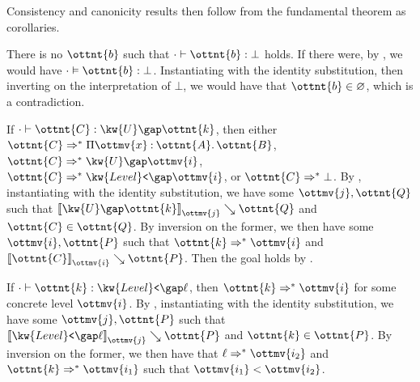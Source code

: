 \documentclass[a4paper,UKenglish,cleveref,autoref,thm-restate]{lipics-v2021}
\begin{document}
Consistency and canonicity results then follow from the fundamental theorem as corollaries.

\begin{corollary}[Consistency]
  There is no $\ottnt{b}$ such that $  \cdot   \vdash  \ottnt{b}  \mathrel{:}   \bot  $ holds.
  If there were, by ,
  we would have $  \cdot   \vDash  \ottnt{b}  :   \bot  $.
  Instantiating with the identity substitution,
  then inverting on the interpretation of $ \bot $,
  we would have that $ \ottnt{b}  \in   \varnothing  $, which is a contradiction.
\end{corollary}

\begin{corollary} \label{lem:canon:univ}
  If $  \cdot   \vdash  \ottnt{C}  \mathrel{:}   \kw{U} \gap  \ottnt{k}  $,
  then either $ \ottnt{C}  \Rightarrow^\ast   \Pi  \ottmv{x}  \mathbin{:}  \ottnt{A}  \mathpunct{.}  \ottnt{B}  $, $ \ottnt{C}  \Rightarrow^\ast   \kw{U} \gap   \ottmv{i}   $, $ \ottnt{C}  \Rightarrow^\ast   \kw{Level}\texttt{<} \gap   \ottmv{i}   $, or $ \ottnt{C}  \Rightarrow^\ast   \bot  $.
  By ,
  instantiating with the identity substitution,
  we have some $\ottmv{j}, \ottnt{Q}$ such that $ \mathopen{\llbracket}   \kw{U} \gap  \ottnt{k}   \mathclose{\rrbracket}_{ \ottmv{j} } \searrow  \ottnt{Q} $ and $ \ottnt{C}  \in  \ottnt{Q} $.
  By inversion on the former,
  we then have some $\ottmv{i}, \ottnt{P}$ such that $ \ottnt{k}  \Rightarrow^\ast   \ottmv{i}  $ and $ \mathopen{\llbracket}  \ottnt{C}  \mathclose{\rrbracket}_{ \ottmv{i} } \searrow  \ottnt{P} $.
  Then the goal holds by .
\end{corollary}

\begin{corollary}
  If $  \cdot   \vdash  \ottnt{k}  \mathrel{:}   \kw{Level}\texttt{<} \gap  \ell  $,
  then $ \ottnt{k}  \Rightarrow^\ast   \ottmv{i}  $ for some concrete level $\ottmv{i}$.
  By ,
  instantiating with the identity substitution,
  we have some $\ottmv{j}, \ottnt{P}$ such that $ \mathopen{\llbracket}   \kw{Level}\texttt{<} \gap  \ell   \mathclose{\rrbracket}_{ \ottmv{j} } \searrow  \ottnt{P} $ and $ \ottnt{k}  \in  \ottnt{P} $.
  By inversion on the former,
  we then have that $ \ell  \Rightarrow^\ast   \ottmv{i_{{\mathrm{2}}}}  $ and $ \ottnt{k}  \Rightarrow^\ast   \ottmv{i_{{\mathrm{1}}}}  $ such that $ \ottmv{i_{{\mathrm{1}}}}  <  \ottmv{i_{{\mathrm{2}}}} $.
\end{corollary}
\end{document}
